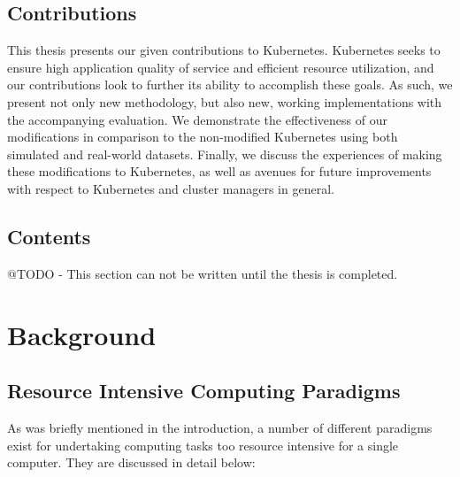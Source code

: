 \documentclass[twoside]{report}
\begin{document}
\section{Contributions}

This thesis presents our given contributions to Kubernetes. Kubernetes seeks to
ensure high application quality of service and efficient resource utilization,
and our contributions look to further its ability to accomplish these
goals. As such, we present not only new methodology, but also new, working
implementations with the accompanying evaluation. We demonstrate the effectiveness
of our modifications in comparison to the non-modified Kubernetes using both
simulated and real-world datasets. Finally, we
discuss the experiences of making these modifications to Kubernetes, as well as
avenues for future improvements with respect to Kubernetes and cluster managers in
general.

\section{Contents}

@TODO - This section can not be written until the thesis is completed.

\chapter{Background}

\section{Resource Intensive Computing Paradigms}

As was briefly mentioned in the introduction, a number of different paradigms
exist for undertaking computing tasks too resource intensive for a single
computer. They are discussed in detail below:
\end{document}
